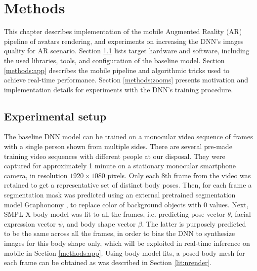 \chapter{Methods}\label{chapter:methods}

This chapter describes implementation of the mobile Augmented Reality (AR) pipeline of avatars rendering, and experiments on increasing the DNN's \cite{dnn:stylepeople21} images quality for AR scenario. Section \ref{methods:dev-setup} lists target hardware and software, including the used libraries, tools, and configuration of the baseline model. Section \ref{methods:app} describes the mobile pipeline and algorithmic tricks used to achieve real-time performance. Section \ref{methods:zooms} presents motivation and implementation details for experiments with the DNN's training procedure.

\section{Experimental setup}\label{methods:dev-setup}

The baseline DNN \cite{dnn:stylepeople21} model can be trained on a monocular video sequence of frames with a single person shown from multiple sides. There are several pre-made training video sequences with different people at our disposal. They were captured for approximately 1 minute on a stationary monocular smartphone camera, in resolution $1920 \times 1080$ pixels. Only each 8th frame from the video was retained to get a representative set of distinct body poses. Then, for each frame a segmentation mask was predicted using an external pretrained segmentation model Graphonomy \cite{dnn:graphonomy19}, to replace color of background objects with 0 values. Next, SMPL-X \cite{dnn:smplx19} body model was fit to all the frames, i.e. predicting pose vector $\theta$, facial expression vector $\psi$, and body shape vector $\beta$. The latter is purposely predicted to be the same across all the frames, in order to bias the DNN to synthesize images for this body shape only, which will be exploited in real-time inference on mobile in Section \ref{methods:app}. Using body model fits, a posed body mesh for each frame can be obtained as was described in Section \ref{lit:nrender}. 

